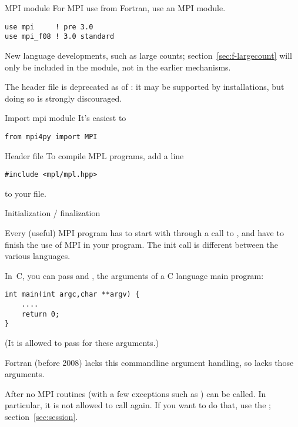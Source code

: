 \begin{fortrannote}{MPI module}
For MPI use from Fortran, use an MPI module.
\begin{verbatim}
use mpi     ! pre 3.0
use mpi_f08 ! 3.0 standard
\end{verbatim}

  New language developments, such as large counts; section~\ref{sec:f-largecount}
  will only be included in the  module,
  not in the earlier mechanisms.

  The header file  is deprecated as of :
  it may be supported by installations, but doing so is strongly discouraged.
\end{fortrannote}

\begin{pythonnote}{Import mpi module}
  It's easiest to
\begin{lstlisting}
from mpi4py import MPI
\end{lstlisting}
\end{pythonnote}

\begin{mplnote}{Header file}
  To compile MPL programs, add a line
\begin{lstlisting}
#include <mpl/mpl.hpp>
\end{lstlisting}
  to your file.
\end{mplnote}

 {Initialization / finalization}
\label{sec:mpi-init}

Every (useful) MPI program has to start with 
through a call to
, and have
 to finish the use of MPI in your program.
The init call is different between the various languages.

In~C, you can pass  and , the arguments
of a C language main program:
 \begin{lstlisting}
int main(int argc,char **argv) {
    ....
    return 0;
}
\end{lstlisting}
(It is allowed to pass  for these arguments.)

Fortran (before 2008) lacks this commandline argument handling,
so  lacks those arguments.

After  no MPI routines
(with a few exceptions such as )
can be called.
In particular, it is not allowed to call  again.
If you want to do that, use the ; section~\ref{sec:session}.

